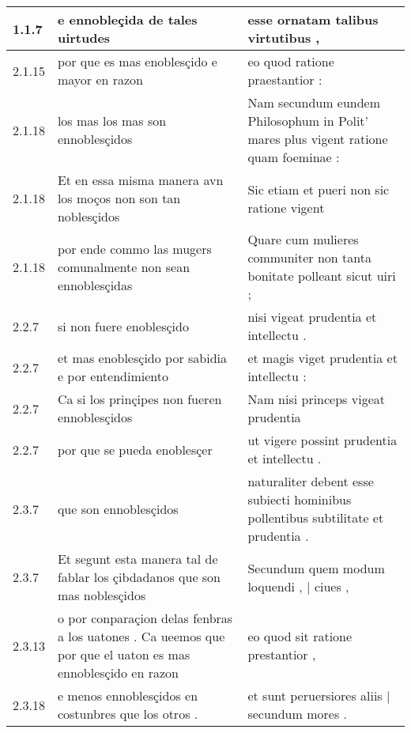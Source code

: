 \begin{tabular}{|p{1cm}|p{6.5cm}|p{6.5cm}|}

\hline
1.1.7 & e ennobleçida de tales uirtudes & esse ornatam talibus virtutibus , \\\hline
2.1.15 & por que es mas enoblesçido e mayor en razon & eo quod ratione praestantior : \\\hline
2.1.18 & los mas los mas son ennoblesçidos & Nam secundum eundem Philosophum in Polit’ mares plus vigent ratione quam foeminae : \\\hline
2.1.18 & Et en essa misma manera avn los moços non son tan noblesçidos & Sic etiam et pueri non sic ratione vigent \\\hline
2.1.18 & por ende commo las mugers comunalmente non sean ennoblesçidas & Quare cum mulieres communiter non tanta bonitate polleant sicut uiri ; \\\hline
2.2.7 & si non fuere enoblesçido & nisi vigeat prudentia et intellectu . \\\hline
2.2.7 & et mas enoblesçido por sabidia e por entendimiento & et magis viget prudentia et intellectu : \\\hline
2.2.7 & Ca si los prinçipes non fueren ennoblesçidos & Nam nisi princeps vigeat prudentia \\\hline
2.2.7 & por que se pueda enoblesçer & ut vigere possint prudentia et intellectu . \\\hline
2.3.7 & que son ennoblesçidos & naturaliter debent esse subiecti hominibus pollentibus subtilitate et prudentia . \\\hline
2.3.7 & Et segunt esta manera tal de fablar los çibdadanos que son mas noblesçidos & Secundum quem modum loquendi , | ciues , \\\hline
2.3.13 & o por conparaçion delas fenbras a los uatones . Ca ueemos que por que el uaton es mas ennoblesçido en razon & eo quod sit ratione prestantior , \\\hline
2.3.18 & e menos ennoblesçidos en costunbres que los otros . & et sunt peruersiores aliis | secundum mores . \\\hline

\end{tabular}
